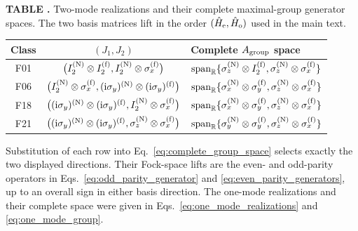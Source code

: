 \documentclass[onecolumn,aps,prb,amsmath,amssymb,superscriptaddress,longbibliography]{revtex4-2}
\newcommand{\ii}{\mathrm{i}}
\begin{document}
\begin{center}
\label{tab:explicit_realizations}
\begin{minipage}{0.98\linewidth}
\small
\textbf{TABLE \thetable.}\enspace
Two-mode realizations and their complete maximal-group generator spaces.  The
two basis matrices lift in the order
\((\hat H_{\rm e},\hat H_{\rm o})\) used in the main text.
\par\vspace{0.6\baselineskip}
\centering
\begin{ruledtabular}
\begin{tabular}{ccl}
Class & \((J_1,J_2)\) & Complete \(A_{\rm group}\) space \\ \hline
F01 &
\(\bigl(I_2^{({\rm N})}\otimes I_2^{({\rm f})},
I_2^{({\rm N})}\otimes\sigma_x^{({\rm f})}\bigr)\) &
\(\operatorname{span}_{\mathbb R}
\{\sigma_z^{({\rm N})}\otimes I_2^{({\rm f})},
\sigma_z^{({\rm N})}\otimes\sigma_x^{({\rm f})}\}\)\\
F06 &
\(\bigl(I_2^{({\rm N})}\otimes\sigma_x^{({\rm f})},
(\ii\sigma_y)^{({\rm N})}\otimes(\ii\sigma_y)^{({\rm f})}\bigr)\) &
\(\operatorname{span}_{\mathbb R}
\{\sigma_x^{({\rm N})}\otimes\sigma_y^{({\rm f})},
\sigma_z^{({\rm N})}\otimes\sigma_x^{({\rm f})}\}\)\\
F18 &
\(\bigl((\ii\sigma_y)^{({\rm N})}\otimes(\ii\sigma_y)^{({\rm f})},
I_2^{({\rm N})}\otimes\sigma_x^{({\rm f})}\bigr)\) &
\(\operatorname{span}_{\mathbb R}
\{\sigma_x^{({\rm N})}\otimes\sigma_y^{({\rm f})},
\sigma_z^{({\rm N})}\otimes\sigma_x^{({\rm f})}\}\)\\
F21 &
\(\bigl((\ii\sigma_y)^{({\rm N})}\otimes(\ii\sigma_y)^{({\rm f})},
\sigma_z^{({\rm N})}\otimes\sigma_x^{({\rm f})}\bigr)\) &
\(\operatorname{span}_{\mathbb R}
\{\sigma_y^{({\rm N})}\otimes\sigma_y^{({\rm f})},
\sigma_z^{({\rm N})}\otimes\sigma_x^{({\rm f})}\}\)
\end{tabular}
\end{ruledtabular}
\end{minipage}
\end{center}

Substitution of each row into Eq.~\eqref{eq:complete_group_space} selects
exactly the two displayed directions.  Their Fock-space lifts are the
even- and odd-parity operators in
Eqs.~\eqref{eq:odd_parity_generator} and
\eqref{eq:even_parity_generators}, up to an overall sign in either basis
direction.  The one-mode realizations and their complete space were given in
Eqs.~\eqref{eq:one_mode_realizations} and \eqref{eq:one_mode_group}.
\end{document}
